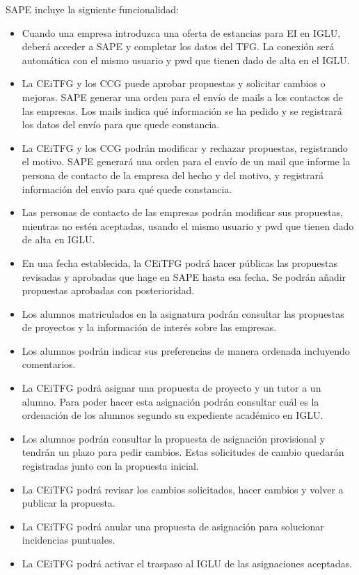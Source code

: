 \documentclass[pdftex,11pt,a4paper]{book}
\begin{document}
SAPE incluye la siguiente funcionalidad:
\begin{itemize}
\item Cuando una empresa introduzca una oferta de estancias para EI en IGLU, deberá acceder a SAPE y completar los datos del TFG. La conexión será automática con el mismo usuario y pwd que tienen dado de alta en el IGLU.
\item La CEiTFG y los CCG puede aprobar propuestas y solicitar cambios o mejoras. SAPE generar una orden para el envío de mails a los contactos de las empresas. Los mails indica qué información se ha pedido y se registrará los datos del envío para que quede constancia.
\item La CEiTFG y los CCG podrán modificar y rechazar propuestas, registrando el motivo. SAPE generará una orden para el envío de un mail que informe la persona de contacto de la empresa del hecho y del motivo, y registrará información del envío para qué quede constancia.
\item Las personas de contacto de las empresas podrán modificar sus propuestas, mientras no estén aceptadas, usando el mismo usuario y pwd que tienen dado de alta en IGLU.
\item En una fecha establecida, la CEiTFG podrá hacer públicas las propuestas revisadas y aprobadas que hage en SAPE hasta esa fecha. Se podrán añadir propuestas aprobadas con posterioridad.
\item Los alumnos matriculados en la asignatura podrán consultar las propuestas de proyectos y la información de interés sobre las empresas.
\item Los alumnos podrán indicar sus preferencias de manera ordenada incluyendo comentarios.
\item La CEiTFG podrá asignar una propuesta de proyecto y un tutor a un alumno. Para poder hacer esta asignación podrán consultar cuál es la ordenación de los alumnos segundo su expediente académico en IGLU.
\item Los alumnos podrán consultar la propuesta de asignación provisional y tendrán un plazo para pedir cambios. Estas solicitudes de cambio quedarán registradas junto con la propuesta inicial.
\item La CEiTFG podrá revisar los cambios solicitados, hacer cambios y volver a publicar la propuesta.
\item La CEiTFG podrá anular una propuesta de asignación para solucionar incidencias puntuales.
\item La CEiTFG podrá activar el traspaso al IGLU de las asignaciones aceptadas.

\end{itemize}
\end{document}

